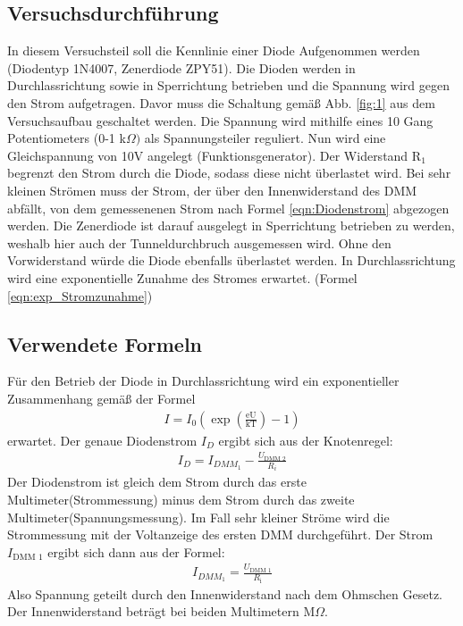 \documentclass[12pt,a4paper]{article}
\begin{document}
\subsection{Versuchsdurchführung}
In diesem Versuchsteil soll die Kennlinie einer Diode Aufgenommen werden (Diodentyp 1N4007, Zenerdiode ZPY51). Die Dioden werden in Durchlassrichtung sowie in Sperrichtung betrieben und die Spannung wird gegen den Strom aufgetragen. Davor muss die Schaltung gemäß Abb. \ref{fig:1} aus dem Versuchsaufbau geschaltet werden. Die Spannung wird mithilfe eines 10 Gang Potentiometers (0-1 k$\Omega)$ als Spannungsteiler reguliert. Nun wird eine Gleichspannung von 10V angelegt (Funktionsgenerator). Der Widerstand R$_1$ begrenzt den Strom durch die Diode, sodass diese nicht überlastet wird. Bei sehr kleinen Strömen muss der Strom, der über den Innenwiderstand des DMM abfällt, von dem gemessenenen Strom nach Formel \ref{eqn:Diodenstrom} abgezogen werden. Die Zenerdiode ist darauf ausgelegt in Sperrichtung betrieben zu werden, weshalb hier auch der Tunneldurchbruch ausgemessen wird. Ohne den Vorwiderstand würde die Diode ebenfalls überlastet werden. In Durchlassrichtung wird eine exponentielle Zunahme des Stromes erwartet. (Formel \ref{eqn:exp_Stromzunahme})
\subsection{Verwendete Formeln}
Für den Betrieb der Diode in Durchlassrichtung wird ein exponentieller Zusammenhang gemäß der Formel
\begin{align}
I = I_0(\exp(\frac{\text{eU}}{\text{kT}})-1)
\label{eqn:exp_Stromzunahme}
\end{align}
erwartet.
Der genaue Diodenstrom $I_D$ ergibt sich aus der Knotenregel:
\begin{align}
I_D = I_{DMM_1}-\frac{U_\text{DMM 2}}{R_i}
\label{eqn:Diodenstrom}
\end{align}
Der Diodenstrom ist gleich dem Strom durch das erste Multimeter(Strommessung) minus dem Strom durch das zweite Multimeter(Spannungsmessung).
Im Fall sehr kleiner Ströme wird die Strommessung mit der Voltanzeige des ersten DMM durchgeführt.
Der Strom $I_\text{DMM 1}$ ergibt sich dann aus der Formel:
\begin{align}
I_{DMM_1} = \frac{U_\text{DMM 1}}{R_\text{i}}
\end{align}
Also Spannung geteilt durch den Innenwiderstand nach dem Ohmschen Gesetz.
Der Innenwiderstand beträgt bei beiden Multimetern \unit[10]{M$\Omega$}.
\end{document}
